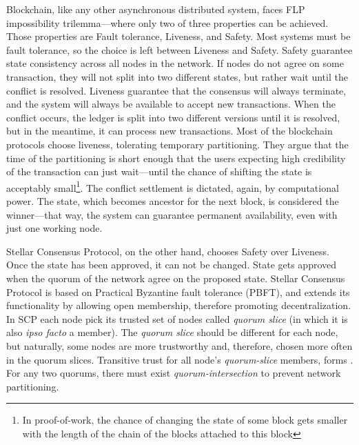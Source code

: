 Blockchain, like any other asynchronous distributed system, faces FLP\cite{fischer1985impossibility} impossibility trilemma––where only two of three properties can be achieved. Those properties are Fault tolerance, Liveness, and Safety. Most systems must be fault tolerance, so the choice is left between Liveness and Safety. Safety guarantee state consistency across all nodes in the network. If nodes do not agree on some transaction, they will not split into two different states, but rather wait until the conflict is resolved. Liveness guarantee that the consensus will always terminate, and the system will always be available to accept new transactions. When the conflict occurs, the ledger is split into two different versions until it is resolved, but in the meantime, it can process new transactions. Most of the blockchain protocols choose liveness, tolerating temporary partitioning. They argue that the time of the partitioning is short enough that the users expecting high credibility of the transaction can just wait---until the chance of shifting the state is acceptably small\footnote{In proof-of-work, the chance of changing the state of some block gets smaller with the length of the chain of the blocks attached to this block}. The conflict settlement is dictated, again, by computational power. The state, which becomes ancestor for the next block, is considered the winner—that way, the system can guarantee permanent availability, even with just one working node. 

Stellar Consensus Protocol, on the other hand, chooses Safety over Liveness. Once the state has been approved, it can not be changed. State gets approved when the quorum of the network agree on the proposed state. 
Stellar Consensus Protocol is based on Practical Byzantine fault tolerance (PBFT)\cite{castro1999practical}, and extends its functionality by allowing open membership, therefore promoting decentralization. In SCP each node pick its trusted set of nodes called \textit{quorum slice} (in which it is also \textit{ipso facto} a member). The \textit{quorum slice} should be different for each node, but naturally, some nodes are more trustworthy and, therefore, chosen more often in the quorum slices. Transitive trust for all node's \textit{quorum-slice} members, forms . For any two quorums, there must exist \textit{quorum-intersection} to prevent network partitioning.

